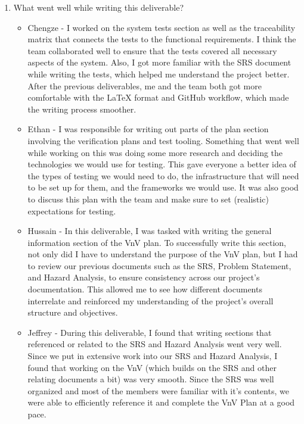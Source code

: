 \documentclass[12pt, titlepage]{article}
\begin{document}
\begin{enumerate}
  \item What went well while writing this deliverable?
  \begin{itemize}
    \item Chengze - I worked on the system tests section as well as the traceability matrix 
    that connects the tests to the functional requirements. I think the team collaborated well 
    to ensure that the tests covered all necessary aspects of the system. Also, I got more familiar
    with the SRS document while writing the tests, which helped me understand the project better. After
    the previous deliverables, me and the team both got more comfortable with the LaTeX format and GitHub workflow,
    which made the writing process smoother.
    \item Ethan - I was responsible for writing out parts of the plan section
      involving the verification plans and test tooling. Something that went
      well while working on this was doing some more research and deciding the
      technologies we would use for testing. This gave everyone a better idea
      of the types of testing we would need to do, the infrastructure that will
      need to be set up for them, and the frameworks we would use. It was also
      good to discuss this plan with the team and make sure to set (realistic)
      expectations for testing.
    \item Hussain - In this deliverable, I was tasked with writing the
        general information section of the VnV plan. To successfully write
        this section, not only did I have to understand the purpose of the
        VnV plan, but I had to review our previous documents such as the SRS,
        Problem Statement, and Hazard Analysis, to ensure consistency across
        our project's documentation. This allowed me to see how different
        documents interrelate and reinforced my understanding of the
        project's overall structure and objectives.
    \item Jeffrey - During this deliverable, I found that writing sections
      that referenced or related to the SRS and Hazard Analysis went very well.
      Since we put in extensive work into our SRS and Hazard Analysis, I found
      that working on the VnV (which builds on the SRS and other relating
      documents a bit) was very smooth. Since the SRS was well organized and
      most of the members were familiar with it's contents, we were able to
      efficiently reference it and complete the VnV Plan at a good pace.

\end{itemize}
\end{enumerate}
\end{document}
